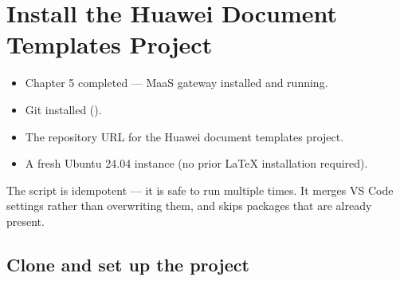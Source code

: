 \documentclass{guide}
\begin{document}
\section{Install the Huawei Document Templates Project}

\begin{objectives}

  \prerequisites
  \begin{itemize}
    \item Chapter 5 completed — MaaS gateway installed and running.
    \item Git installed ().
    \item The repository URL for the Huawei document templates project.
    \item A fresh Ubuntu 24.04 instance (no prior LaTeX installation
          required).
  \end{itemize}
\end{objectives}

\begin{infobox}
The  script is idempotent --- it is safe to run multiple
times. It merges VS Code settings rather than overwriting them, and
 skips packages that are already present.
\end{infobox}

\subsection{Clone and set up the project}
\end{document}
